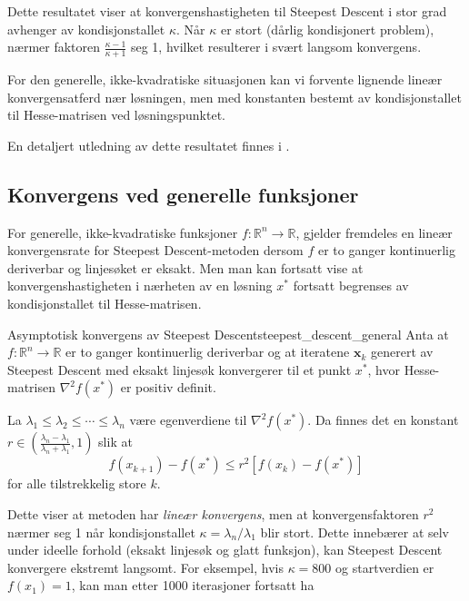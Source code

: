 Dette resultatet viser at konvergenshastigheten til Steepest Descent i stor grad avhenger av kondisjonstallet $\kappa$. Når $\kappa$ er stort (dårlig kondisjonert problem), nærmer faktoren $\frac{\kappa - 1}{\kappa + 1}$ seg 1, hvilket resulterer i svært langsom konvergens.

For den generelle, ikke-kvadratiske situasjonen kan vi forvente lignende lineær konvergensatferd nær løsningen, men med konstanten bestemt av kondisjonstallet til Hesse-matrisen ved løsningspunktet.

En detaljert utledning av dette resultatet finnes i \cite{luenberger1984linear}.

\subsection{Konvergens ved generelle funksjoner}
For generelle, ikke-kvadratiske funksjoner \(f : \mathbb{R}^n \to \mathbb{R}\), gjelder fremdeles en lineær konvergensrate for Steepest Descent-metoden dersom \(f\) er to ganger kontinuerlig deriverbar og linjesøket er eksakt.
Men man kan fortsatt vise at konvergenshastigheten i nærheten av en løsning \(x^\ast\) fortsatt begrenses av kondisjonstallet til Hesse-matrisen.

\begin{theorem}{Asymptotisk konvergens av Steepest Descent}{steepest_descent_general}
	Anta at \(f : \mathbb{R}^n \to \mathbb{R}\) er to ganger kontinuerlig deriverbar og at iteratene \(\symbf{x}_k\) generert av Steepest Descent med eksakt linjesøk konvergerer til et punkt \(x^\ast\), hvor Hesse-matrisen \(\nabla^2 f(x^\ast)\) er positiv definit.

	La \(\lambda_1 \leq \lambda_2 \leq \cdots \leq \lambda_n\) være egenverdiene til \(\nabla^2 f(x^\ast)\). Da finnes det en konstant \(r \in \left( \frac{\lambda_n - \lambda_1}{\lambda_n + \lambda_1}, 1 \right)\) slik at
	\[
		f(x_{k+1}) - f(x^\ast) \leq r^2 \left[ f(x_k) - f(x^\ast) \right]
	\]
	for alle tilstrekkelig store \(k\).
\end{theorem}

Dette viser at metoden har \emph{lineær konvergens}, men at konvergensfaktoren \(r^2\) nærmer seg 1 når kondisjonstallet \(\kappa = \lambda_n / \lambda_1\) blir stort. Dette innebærer at selv under ideelle forhold (eksakt linjesøk og glatt funksjon), kan Steepest Descent konvergere ekstremt langsomt. For eksempel, hvis \(\kappa = 800\) og startverdien er \(f(x_1) = 1\), kan man etter 1000 iterasjoner fortsatt ha

